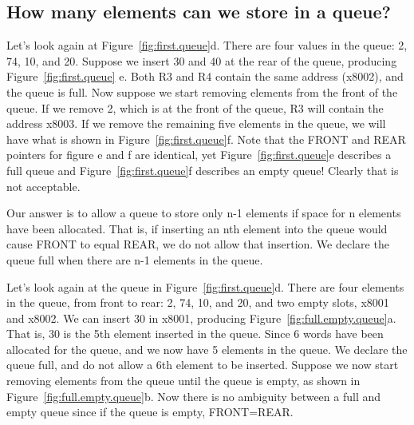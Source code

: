 \documentclass{patt}
\begin{document}

\subsection{How many elements can we store in a queue?}

Let's look again at Figure~\ref{fig:first.queue}d.  There are four values 
in the queue: 2, 74, 10, and 20.  Suppose we insert 30 and 40 at the rear of 
the queue, producing Figure~\ref{fig:first.queue} e.
Both R3 and R4 contain the same address (x8002), and the queue is full.
Now suppose we start removing elements from the front of the queue.  If we
remove 2, which is at the front of the queue, R3 will contain the address 
x8003.  If we remove the remaining five elements in the queue, we will have 
what is shown in Figure~\ref{fig:first.queue}f.  Note that the FRONT and REAR 
pointers for figure e and f are identical, yet Figure~\ref{fig:first.queue}e 
describes a full queue and Figure~\ref{fig:first.queue}f describes an
empty queue!  Clearly that is not acceptable.

Our answer is to allow a queue to store only n-1 elements if space for 
n elements have been allocated.  That is, if inserting an nth element 
into the queue would cause FRONT to equal REAR, we do not allow that 
insertion.  We declare the queue full when there are n-1 elements in the queue.

Let's look again at the queue in Figure~\ref{fig:first.queue}d.  There are 
four elements in the 
queue, from front to rear: 2, 74, 10, and 20, and two empty slots, x8001 and 
x8002.  We can insert 30 in x8001, producing Figure~\ref{fig:full.empty.queue}a.
That is, 30 is the 5th element inserted in the queue. Since 6 words have been 
allocated for the queue, and we now have 5 elements in the queue. We declare
the queue full, and do not allow a 6th element to be inserted.  Suppose we 
now start removing elements from the queue until the queue is empty, as shown 
in Figure~\ref{fig:full.empty.queue}b.  Now there is no ambiguity between a 
full and empty queue since if the queue is empty, FRONT=REAR. 
\end{document}
